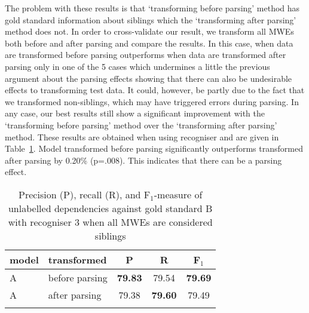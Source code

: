 \documentclass[output=paper]{langsci/langscibook}
\begin{document}
\indent The problem with these results is that `transforming before parsing' method has gold standard information about siblings which the `transforming after parsing' method does not. In order to cross-validate our result, we transform all MWEs both before and after parsing and compare the results. In this case, {\modelA} when data are transformed before parsing outperforms {\modelA} when data are transformed after parsing only in one of the 5 cases which undermines a little the previous argument about the parsing effects showing that there can also be undesirable effects to transforming test data. It could, however, be partly due to the fact that we transformed non-siblings, which may have triggered errors during parsing. In any case, our best results still show a significant improvement with the `transforming before parsing' method over the `transforming after parsing' method. These results are obtained when using recogniser and are given in Table~\ref{del:tab:res1tris}. Model transformed before parsing significantly outperforms {\modelA} transformed after parsing by 0.20\% (p=.008). This indicates that there can be a parsing effect.

\begin{table}[h]
    \centering
    \begin{tabular}{l l c c c} %
      \lsptoprule
        \textnormal{model}
        & \textnormal{transformed}
        & \textnormal{P}
        & \textnormal{R}
        & \textnormal{F$_1$}
        \\ %
        \midrule
        A & before parsing &\textbf{79.83} & 79.54  & \textbf{79.69} \\
        A & after parsing &79.38  &\textbf{79.60}  & 79.49 \tabularnewline %
        \lspbottomrule
    \end{tabular}
    \caption{Precision (P), recall (R), and F$_1$-measure of unlabelled dependencies against gold standard B with recogniser 3 when all MWEs are considered siblings \label{del:tab:res1tris}}
\end{table}
\end{document}
